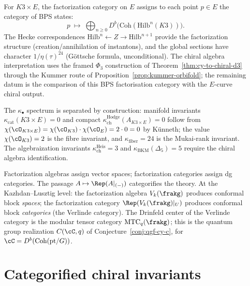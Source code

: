 \begin{conjecture}
\label{conj:bps-factorization-category}
\ClaimStatusConjectured
For $K3 \times E$, the factorization category on $E$ assigns to each point $p \in E$ the category of BPS states:
\[
 p \;\longmapsto\; \bigoplus_{n \geq 0} D^b\!\bigl(\mathrm{Coh}(\mathrm{Hilb}^n(K3))\bigr).
\]
The Hecke correspondences $\mathrm{Hilb}^n \xleftarrow{} Z \xrightarrow{} \mathrm{Hilb}^{n+1}$ provide the factorization structure (creation/annihilation of instantons), and the global sections have character $1/\eta(\tau)^{24}$ (G\"ottsche formula, unconditional). The chiral algebra interpretation uses the framed \(\Phi_3\) construction of Theorem~\ref{thm:cy-to-chiral-d3} through the Kummer route of Proposition~\ref{prop:kummer-orbifold}; the remaining datum is the comparison of this BPS factorisation category with the \(E\)-curve chiral output.

The $\kappa_\bullet$ spectrum is separated by construction: manifold
invariants $\kappa_{\mathrm{cat}}(K3 \times E) = 0$ and compact
$\kappa_{\mathrm{ch}}^{\mathrm{Hodge}}(A_{K3\times E})=0$ follow from
$\chi(\cO_{K3 \times E}) = \chi(\cO_{K3}) \cdot \chi(\cO_E)
= 2 \cdot 0 = 0$ by K\"unneth; the value $\chi(\cO_{K3}) = 2$ is
the fibre invariant, and $\kappa_{\mathrm{fiber}} = 24$ is the
Mukai-rank invariant. The algebraization invariants
$\kappa_{\mathrm{ch}}^{\mathrm{Heis}} = 3$ and
$\kappa_{\mathrm{BKM}}(\Delta_5) = 5$ require the chiral algebra identification.
\end{conjecture}

\begin{remark}
\label{rem:fact-alg-vs-cat}
Factorization algebras assign vector spaces; factorization categories assign dg categories. The passage $A \mapsto \Rep(A|_{(-)})$ categorifies the theory. At the Kazhdan--Lusztig level: the factorization algebra $V_k(\frakg)$ produces conformal block \emph{spaces}; the factorization category $\Rep(V_k(\frakg)|_U)$ produces conformal block \emph{categories} (the Verlinde category). The Drinfeld center of the Verlinde category is the modular tensor category $\mathrm{MTC}_q(\frakg)$; this is the quantum group realization $C(\cC, q)$ of Conjecture~\ref{conj:qgf-cy-c}, for $\cC = D^b(\mathrm{Coh}(\mathrm{pt}/G))$.
\end{remark}


\section{Categorified chiral invariants}
\label{sec:chiral-khovanov}

